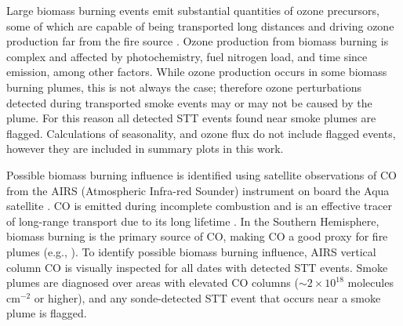 \documentclass[acp, manuscript]{copernicus} %
\begin{document}
    Large biomass burning events emit substantial quantities of ozone precursors, some of which are capable of being transported long distances and driving ozone production far from the fire source \citep{Jaffe2012}.
    Ozone production from biomass burning is complex and affected by photochemistry, fuel nitrogen load, and time since emission, among other factors. 
    While ozone production occurs in some biomass burning plumes, this is not always the case; therefore ozone perturbations detected during transported smoke events may or may not be caused by the plume.
    For this reason all detected STT events found near smoke plumes are flagged.
    Calculations of seasonality, and ozone flux do not include flagged events, however they are included in summary plots in this work.


    Possible biomass burning influence is identified using satellite observations of CO from the AIRS (Atmospheric Infra-red Sounder) instrument on board the Aqua satellite \citep{AIRS3STD}.
    CO is emitted during incomplete combustion and is an effective tracer of long-range transport due to its long lifetime \citep{Edwards2003, Edwards2006}.
    In the Southern Hemisphere, biomass burning is the primary source of CO, making CO a good proxy for fire plumes (e.g., \citet{Sinha2004, Mari2008}).
    To identify possible biomass burning influence, AIRS vertical column CO is visually inspected for all dates with detected STT events.
    Smoke plumes are diagnosed over areas with elevated CO columns ($\sim 2 \times 10^{18}$ molecules cm$^{-2}$ or higher), and any sonde-detected STT event that occurs near a smoke plume is flagged.
\end{document}
